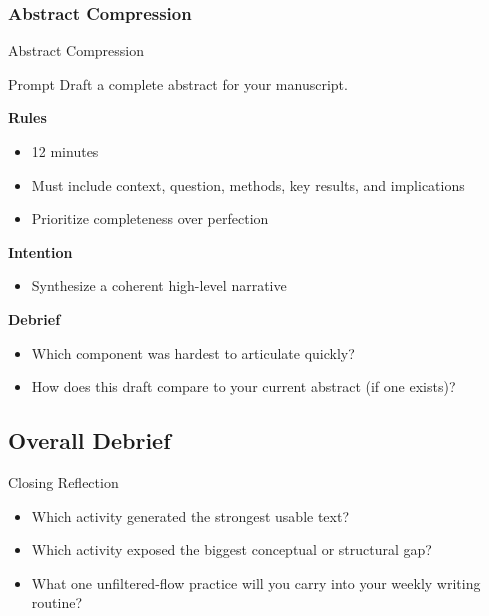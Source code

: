 \documentclass{beamer}
\begin{document}
\subsubsection{Abstract Compression}

\begin{frame}{Abstract Compression}
\begin{block}{Prompt}
Draft a complete abstract for your manuscript.
\end{block}

\vspace{0.8em}
\textbf{Rules}
\begin{itemize}
    \item 12 minutes
    \item Must include context, question, methods, key results, and implications
    \item Prioritize completeness over perfection
\end{itemize}

\textbf{Intention}
\begin{itemize}
    \item Synthesize a coherent high-level narrative
\end{itemize}

\textbf{Debrief}
\begin{itemize}
    \item Which component was hardest to articulate quickly?
    \item How does this draft compare to your current abstract (if one exists)?
\end{itemize}
\end{frame}


\subsection{Overall Debrief}
\begin{frame}{Closing Reflection}
\begin{itemize}
    \item Which activity generated the strongest usable text?
    \item Which activity exposed the biggest conceptual or structural gap?
    \item What one unfiltered-flow practice will you carry into your weekly writing routine?
\end{itemize}
\end{frame}


\end{document}
